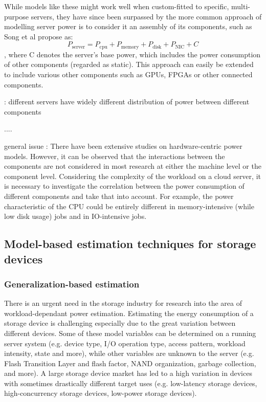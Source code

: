 While models like these might work well when custom-fitted to specific, multi-purpose servers, they have since been surpassed by the more common approach of modelling server power is to consider it an assembly of its components, such as Song et al\parencite{song2013unified} propose as:
\begin{equation}
    P_{\text{server}} = P_{\text{cpu}} + P_{\text{memory}} + P_{\text{disk}} + P_{\text{NIC}} + C
\end{equation}
, where C denotes the server's base power, which includes the power consumption of other components (regarded as static). This approach can easily be extended to include various other components such as GPUs, FPGAs or other connected components.

\parencite{katalEnergyEfficiencyCloud2022}: different servers have widely different distribution of power between different components


....

general issue \parencite{lin2020taxonomy}: There have been extensive studies on hardware-centric power models. However, it can be observed that the interactions between the components are not considered in most research at either the machine level or the component level. Considering the complexity of the workload on a cloud server, it is necessary to investigate the correlation between the power consumption of different components and take that into account. For example, the power characteristic of the CPU could be entirely different in memory-intensive (while low disk usage) jobs and in IO-intensive jobs.


\subsection{Model-based estimation techniques for storage devices}
\label{sec:model-based_storage_power}

\subsubsection{Generalization-based estimation}
There is an urgent need in the storage industry for research into the area of workload-dependant power estimation\parencite{allaloufStorageModelingPower2009}. Estimating the energy consumption of a storage device is challenging especially due to the great variation between different devices. Some of these model variables can be determined on a running server system (e.g. device type, I/O operation type, access pattern, workload intensity, state and more), while other variables are unknown to the server (e.g. Flash Transition Layer and flash factor, NAND organization, garbage collection, and more). A large storage device market has led to a high variation in devices with sometimes drastically different target uses (e.g. low-latency storage devices, high-concurrency storage devices, low-power storage devices).


